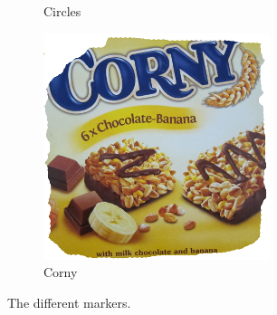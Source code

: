 \begin{figure}[h]
\begin{subfigure}[b]{0.3\linewidth}
 \caption{Circles}
 \label{marker:circle}
 \end{subfigure}
 \begin{subfigure}[b]{0.3\linewidth}
 \centering
 \includegraphics[width=\linewidth]{graphics/Marker3}
 \caption{Corny}
 \label{marker:corny}
 \end{subfigure}
 \caption{The different markers.}
 \label{fig:markers}
\end{figure}

